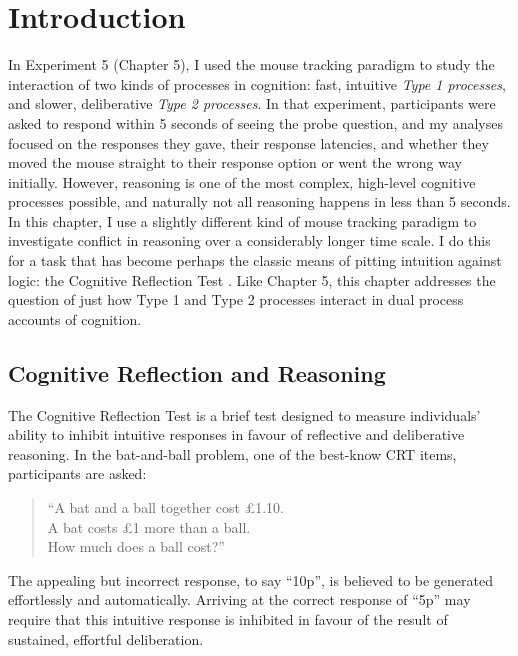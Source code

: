
\section{Introduction}

In Experiment 5 (Chapter 5), I used the mouse tracking paradigm
to study the interaction of two kinds of processes in cognition:
fast, intuitive \emph{Type 1 processes},
and slower, deliberative \emph{Type 2 processes}.
In that experiment, participants were asked to respond
within 5 seconds of seeing the probe question,
and my analyses focused on the responses they gave,
their response latencies,
and whether they moved the mouse straight to their response option
or went the wrong way initially.
However, reasoning is one of the most complex,
high-level cognitive processes possible,
and naturally not all reasoning happens in less than 5 seconds.
In this chapter, I use a slightly different
kind of mouse tracking paradigm
to investigate conflict in reasoning over a considerably longer time scale.
I do this for a task
that has become perhaps the classic means of pitting
intuition against logic: the Cognitive Reflection Test \citep{Frederick2005}.
Like Chapter 5,
this chapter addresses the question of
just how Type 1 and Type 2 processes
interact in dual process accounts of cognition.

\subsection{Cognitive Reflection and Reasoning}

The Cognitive Reflection Test \citep[CRT;][]{Frederick2005}
is a brief test designed to measure
individuals’ ability to inhibit intuitive responses
in favour of reflective and deliberative reasoning.
In the bat-and-ball problem, one of the best-know CRT items,
participants are asked:

\begin{quote}
  ``A bat and a ball together cost £1.10.\\
    A bat costs £1 more than a ball.\\
    How much does a ball cost?''
\end{quote}



The appealing but incorrect response, to say “10p”,
is believed to be generated effortlessly and automatically.
Arriving at the correct response of “5p” may require that
this intuitive response is inhibited in favour of
the result of sustained, effortful deliberation.

